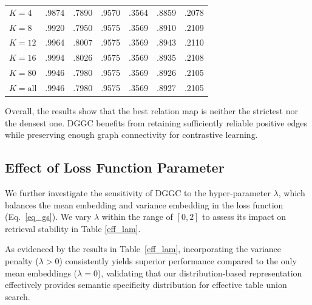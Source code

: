 \begin{table}[t]
{\begin{tabular}{l|cc|cc|cc}
\midrule
\(K=4\)   & .9874 & .7890 & .9570 & .3564 & .8859 & .2078 \\
\(K=8\)   & .9920 & .7950 & .9575 & .3569 & .8910 & .2109 \\
\(K=12\)  & .9964 & .8007 & .9575 & .3569 & .8943 & .2110 \\
\(K=16\)  & .9994 & .8026 & .9575 & .3569 & .8935 & .2108 \\
\(K=80\)  & .9946 & .7980 & .9575 & .3569 & .8926 & .2105 \\
\(K=\mathrm{all}\) & .9946 & .7980 & .9575 & .3569 & .8927 & .2105 \\
\bottomrule
\end{tabular}%
}%
\end{table}

Overall, the results show that the best relation map is neither the strictest nor the densest one. DGGC benefits from retaining sufficiently reliable positive edges while preserving enough graph connectivity for contrastive learning.

\iffalse
\subsection{Effect of Loss Function Parameter}
We further investigate the sensitivity of DGGC to the hyper-parameter $\lambda$, which balances the mean embedding and variance embedding in the loss function (Eq.~\eqref{eq_gs}). We vary $\lambda$ within the range of $[0,2]$ to assess its impact on retrieval stability in Table \ref{eff_lam}. 

As evidenced by the results in Table~\ref{eff_lam}, incorporating the variance penalty ($\lambda > 0$) consistently yields superior performance compared to the only mean embeddings ($\lambda = 0$), validating that our distribution-based representation effectively provides semantic specificity distribution for effective table union search.


